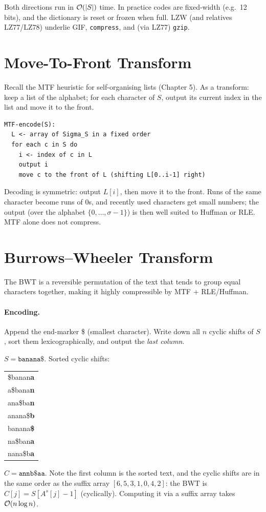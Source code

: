Both directions run in $\mathcal{O}(|S|)$ time. In practice codes are fixed-width
(e.g.\ 12 bits), and the dictionary is reset or frozen when full. LZW (and
relatives LZ77/LZ78) underlie GIF, \texttt{compress}, and (via LZ77) \texttt{gzip}.

\section{Move-To-Front Transform}

Recall the MTF heuristic for self-organising lists (Chapter 5). As a transform:
keep a list of the alphabet; for each character of $S$, output its current index
in the list and move it to the front.

\begin{lstlisting}
MTF-encode(S):
  L <- array of Sigma_S in a fixed order
  for each c in S do
    i <- index of c in L
    output i
    move c to the front of L (shifting L[0..i-1] right)
\end{lstlisting}
Decoding is symmetric: output $L[i]$, then move it to the front. Runs of the
same character become runs of 0s, and recently used characters get small numbers;
the output (over the alphabet $\{0, \ldots, \sigma - 1\}$) is then well suited to
Huffman or RLE. MTF alone does not compress.

\section{Burrows--Wheeler Transform}

The BWT is a reversible permutation of the text that tends to group equal
characters together, making it highly compressible by MTF + RLE/Huffman.

\paragraph{Encoding.} Append the end-marker \$ (smallest character). Write down
all $n$ cyclic shifts of $S$, sort them lexicographically, and output the
\emph{last column}.

\begin{example}
$S = \texttt{banana\$}$. Sorted cyclic shifts:
\begin{center}
\begin{tabular}{>{\ttfamily}l}
\$banan\textbf{a}\\
a\$bana\textbf{n}\\
ana\$ba\textbf{n}\\
anana\$\textbf{b}\\
banana\textbf{\$}\\
na\$ban\textbf{a}\\
nana\$b\textbf{a}
\end{tabular}
\end{center}
$C = \texttt{annb\$aa}$. Note the first column is the sorted text, and the
cyclic shifts are in the same order as the suffix array $[6,5,3,1,0,4,2]$: the
BWT is $C[j] = S[A^s[j] - 1]$ (cyclically). Computing it via a suffix array takes
$\mathcal{O}(n \log n)$.
\end{example}

